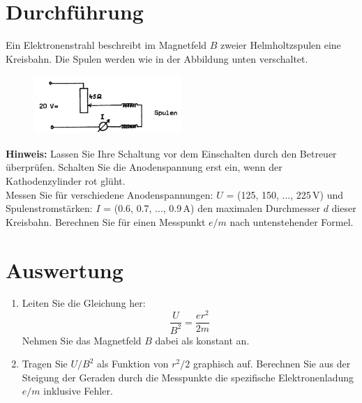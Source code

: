 \section{Durchführung} 

Ein Elektronenstrahl beschreibt im Magnetfeld $B$ zweier Helmholtzspulen eine Kreisbahn. Die Spulen werden wie in der Abbildung unten verschaltet.

\begin{figure}[h]
	\centering
		\includegraphics[width=0.50\textwidth]{Versuch_19-20/Abbildungen/Schaltung-HHSpulen.jpg}
	\label{fig:Schaltung-HHSpulen}
\end{figure}

\textbf{Hinweis:} Lassen Sie Ihre Schaltung vor dem Einschalten durch den Betreuer überprüfen. Schalten Sie die Anodenspannung erst ein, wenn der Kathodenzylinder rot glüht.\\

\noindent
Messen Sie für verschiedene Anodenspannungen: $U$ = (125, 150, ..., 225\,V) und Spulenstromstärken: $I$ = (0.6, 0.7, ..., 0.9\,A) den maximalen Durchmesser $d$ dieser Kreisbahn. Berechnen Sie für einen Messpunkt $e/m$ nach untenstehender Formel.

\section{Auswertung} 

\begin{enumerate}
	\item Leiten Sie die Gleichung her:
		\begin{equation}
			\frac{U}{B^2} = \frac{er^2}{2m}
		\end{equation}
		Nehmen Sie das Magnetfeld $B$ dabei als konstant an.
	\item Tragen Sie $U/B^2$ als Funktion von $r^2/2$ graphisch auf. Berechnen Sie aus der Steigung der Geraden durch die Messpunkte die spezifische Elektronenladung $e/m$ inklusive Fehler.
\end{enumerate}

